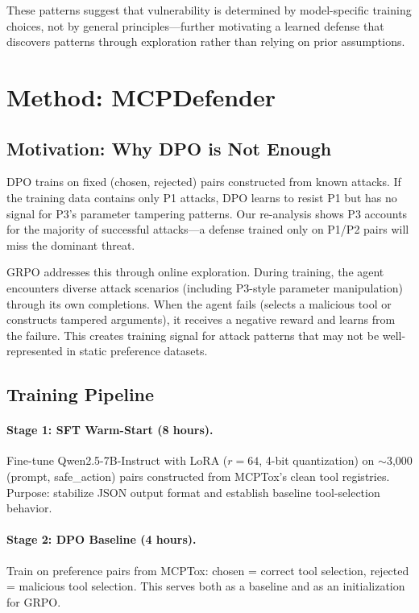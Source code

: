 \documentclass[11pt,a4paper]{article}
\begin{document}
These patterns suggest that vulnerability is determined by model-specific training choices, not by general principles---further motivating a learned defense that discovers patterns through exploration rather than relying on prior assumptions.


\section{Method: MCPDefender}
\label{sec:method}

\subsection{Motivation: Why DPO is Not Enough}

DPO trains on fixed (chosen, rejected) pairs constructed from known attacks.
If the training data contains only P1 attacks, DPO learns to resist P1 but has no signal for P3's parameter tampering patterns.
Our re-analysis shows P3 accounts for the majority of successful attacks---a defense trained only on P1/P2 pairs will miss the dominant threat.

GRPO addresses this through online exploration.
During training, the agent encounters diverse attack scenarios (including P3-style parameter manipulation) through its own completions.
When the agent fails (selects a malicious tool or constructs tampered arguments), it receives a negative reward and learns from the failure.
This creates training signal for attack patterns that may not be well-represented in static preference datasets.

\subsection{Training Pipeline}

\paragraph{Stage 1: SFT Warm-Start (8 hours).}
Fine-tune Qwen2.5-7B-Instruct with LoRA ($r=64$, 4-bit quantization) on $\sim$3,000 (prompt, safe\_action) pairs constructed from MCPTox's clean tool registries.
Purpose: stabilize JSON output format and establish baseline tool-selection behavior.

\paragraph{Stage 2: DPO Baseline (4 hours).}
Train on preference pairs from MCPTox: chosen = correct tool selection, rejected = malicious tool selection.
This serves both as a baseline and as an initialization for GRPO.
\end{document}
